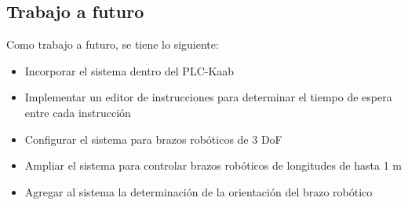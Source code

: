 \subsection{Trabajo a futuro}

Como trabajo a futuro, se tiene lo siguiente:

\begin{itemize}
	\item Incorporar el sistema dentro del PLC-Kaab
	\item Implementar un editor de instrucciones para determinar el tiempo de espera entre cada instrucción
	\item Configurar el sistema para brazos robóticos de 3 DoF
	\item Ampliar el sistema para controlar brazos robóticos de longitudes de hasta 1 m
	\item Agregar al sistema la determinación de la orientación del brazo robótico
\end{itemize}